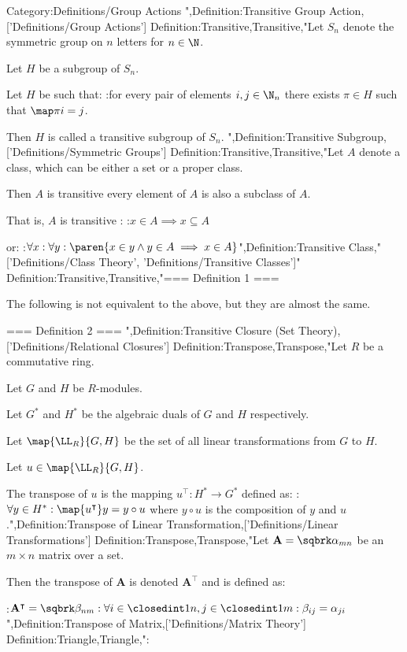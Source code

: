 Category:Definitions/Group Actions
",Definition:Transitive Group Action,['Definitions/Group Actions']
Definition:Transitive,Transitive,"Let $S_n$ denote the symmetric group on $n$ letters for $n \in \N$.

Let $H$ be a subgroup of $S_n$.

Let $H$ be such that:
:for every pair of elements $i, j \in \N_n$ there exists $\pi \in H$ such that $\map \pi i = j$.


Then $H$ is called a transitive subgroup of $S_n$.
",Definition:Transitive Subgroup,['Definitions/Symmetric Groups']
Definition:Transitive,Transitive,"Let $A$ denote a class, which can be either a set or a proper class.

Then $A$ is transitive  every element of $A$ is also a subclass of $A$.


That is, $A$ is transitive :
:$x \in A \implies x \subseteq A$

or:
:$\forall x: \forall y: \paren {x \in y \land y \in A \implies x \in A}$",Definition:Transitive Class,"['Definitions/Class Theory', 'Definitions/Transitive Classes']"
Definition:Transitive,Transitive,"=== Definition 1 ===


The following is not equivalent to the above, but they are almost the same.

=== Definition 2 ===
",Definition:Transitive Closure (Set Theory),['Definitions/Relational Closures']
Definition:Transpose,Transpose,"Let $R$ be a commutative ring.

Let $G$ and $H$ be $R$-modules.

Let $G^*$ and $H^*$ be the algebraic duals of $G$ and $H$ respectively.


Let $\map {\LL_R} {G, H}$ be the set of all linear transformations from $G$ to $H$.

Let $u \in \map {\LL_R} {G, H}$.


The transpose of $u$ is the mapping $u^\intercal: H^* \to G^*$ defined as:
:$\forall y \in H^*: \map {u^\intercal} y = y \circ u$
where $y \circ u$ is the composition of $y$ and $u$.",Definition:Transpose of Linear Transformation,['Definitions/Linear Transformations']
Definition:Transpose,Transpose,"Let $\mathbf A = \sqbrk \alpha_{m n}$ be an $m \times n$ matrix over a set.


Then the transpose of $\mathbf A$ is denoted $\mathbf A^\intercal$ and is defined as:

:$\mathbf A^\intercal = \sqbrk \beta_{n m}: \forall i \in \closedint 1 n, j \in \closedint 1 m: \beta_{i j} = \alpha_{j i}$
",Definition:Transpose of Matrix,['Definitions/Matrix Theory']
Definition:Triangle,Triangle,":

